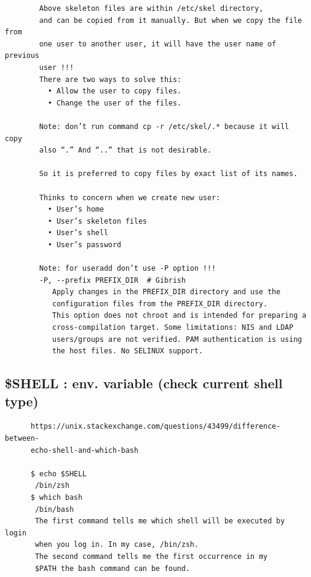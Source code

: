 \documentclass[a4paper,12pt]{article}
\begin{document}
\begin{verbatim}
        Above skeleton files are within /etc/skel directory, 
        and can be copied from it manually. But when we copy the file from
        one user to another user, it will have the user name of previous
        user !!!
        There are two ways to solve this:
          • Allow the user to copy files.
          • Change the user of the files.

        Note: don’t run command cp -r /etc/skel/.* because it will copy          
        also “.” And “..” that is not desirable.

        So it is preferred to copy files by exact list of its names. 
        
        Thinks to concern when we create new user: 
          • User’s home
          • User’s skeleton files
          • User’s shell
          • User’s password
        
        Note: for useradd don’t use -P option !!!
        -P, --prefix PREFIX_DIR  # Gibrish
           Apply changes in the PREFIX_DIR directory and use the 
           configuration files from the PREFIX_DIR directory.
           This option does not chroot and is intended for preparing a
           cross-compilation target. Some limitations: NIS and LDAP 
           users/groups are not verified. PAM authentication is using
           the host files. No SELINUX support.

\end{verbatim}

\subsection{\$SHELL   : env. variable (check current shell type) }
\begin{verbatim}
      https://unix.stackexchange.com/questions/43499/difference-between-
      echo-shell-and-which-bash
      
      $ echo $SHELL
       /bin/zsh
      $ which bash
       /bin/bash
       The first command tells me which shell will be executed by login
       when you log in. In my case, /bin/zsh.
       The second command tells me the first occurrence in my
       $PATH the bash command can be found.

\end{verbatim}
\end{document}
